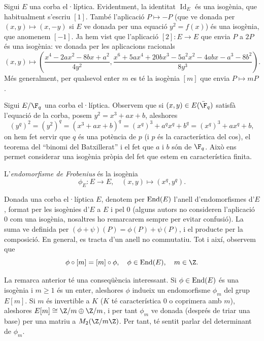 \begin{example}
Sigui $E$ una corba el·líptica. Evidentment, la identitat $\operatorname{Id}_E$ és una isogènia, que habitualment s'escriu $[1]$. També l'aplicació $P\mapsto -P$ (que ve donada per $(x,y)\mapsto (x,-y)$ si $E$ ve donada per una equació $y^2=f(x)$) és una isogènia, que anomenem $[-1]$. Ja hem vist que l'aplicació $[2]\colon E\to E$ que envia $P$ a $2P$ és una isogènia: ve donada per les aplicacions racionals
\[
(x,y)\mapsto  \left(\frac{x^{4} -2 a x^{2} -8 b x + a^{2}}{4y^2},
\frac{x^{6} + 5 a x^{4} + 20 b x^{3} -5 a^{2} x^{2} -4 a b x - a^{3} - 8 b^{2}}{8y^3} \right).
\]
Més generalment, per qualsevol enter $m$ es té la isogènia $[m]$ que envia $P\mapsto mP$.
\end{example}

Sigui $E/\F_q$ una corba el·líptica. Observem que si $(x,y)\in E(\bar\F_q)$ satisfà l'equació de la corba, posem $y^2=x^3+ax+b$,
aleshores
\[
(y^q)^2=(y^{2})^{q} = (x^3+ax+b)^q = (x^q)^3 + a^q x^q + b^q = (x^q)^3 + ax^q + b,
\]
on hem fet servir que $q$ és una potència de $p$ (i $p$ és la característica del cos), el teorema del ``binomi del Batxillerat'' i el fet que $a$ i $b$ són de $\F_q$. Això ens permet considerar una isogènia pròpia del fet que estem en característica finita.

\begin{definition}
L'\emph{endomorfisme de Frobenius} és la isogènia
\[
\phi_E\colon E\to E,\quad (x,y)\mapsto(x^q,y^q).
\]
\end{definition}


\begin{remark}
Donada una corba el·líptica $E$, denotem per $\operatorname{End}(E)$ l'anell d'endomorfismes d'$E$, format per les isogènies d'$E$ a $E$ i pel $0$ (alguns autors no consideren l'aplicació $0$ com una isogènia, nosaltres ho remarcarem sempre per evitar confusió). La suma ve definida per $(\phi+\psi)(P)=\phi(P)+\psi(P)$, i el producte per la composició. En general, es tracta d'un anell no commutatiu. Tot i així, observem que
\[
\phi\circ [m] = [m]\circ \phi, \quad \phi\in \End(E),\quad m\in \Z.
\]
\end{remark}

La remarca anterior té una conseqüència interessant. Si $\phi\in \operatorname{End}(E)$ és una isogènia i $m\geq 1$ és un enter, aleshores $\phi$ indueix un endomorfisme $\phi_m$ del grup $E[m]$. Si $m$ és invertible a $K$ ($K$ té característica $0$ o coprimera amb $m$), aleshores $E[m]\cong \Z/m\oplus \Z/m$, i per tant $\phi_m$ ve donada (després de triar una base) per una matriu a $M_2(\Z/m\Z)$. Per tant, té sentit parlar del determinant de $\phi_m$.

